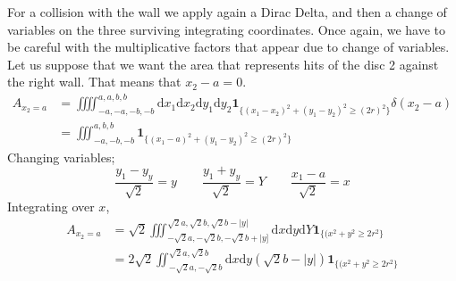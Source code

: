 \documentclass[letterpaper,10pt, jcp, aps]{revtex4-1}
\newcommand{\rd}{\!\mathrm{d}}
\newcommand{\indicator}[1]{\mathbf{1}_{ \{   #1 \} } }
\begin{document}
    For a collision with the wall we apply again a Dirac Delta, and then a change
    of variables on the three surviving integrating coordinates. Once again, we
    have to be careful with the multiplicative factors that appear due to change
    of variables. Let us suppose that we want the area that represents hits of
    the disc 2 against the right wall. That means that $x_2-a=0$. 
    \begin{align}
      A_{x_2=a} & =\iiiint_{-a,-a,-b,-b}^{a,a,b,b} \rd x_1 \rd x_2 \rd y_1 \rd y_2 
      \indicator{(x_1-x_2)^2+(y_1-y_2)^2 \geq (2 r)^2} \delta (x_2-a)\\
      &=\iiint_{-a,-b,-b}^{a,b,b} \indicator{(x_1-a)^2+(y_1-y_2)^2 \geq (2 r)^2} 
    \end{align}
    Changing variables;
    \begin{equation}
      \frac{y_1-y_y}{\sqrt{2}} =  y  \qquad \frac{y_1+y_y}{\sqrt{2}}=Y \qquad \frac{x_1-a}{\sqrt{2}}=x
    \end{equation}
    Integrating over $x$,
    \begin{align}\label{areachoquexy}
      A_{x_2=a} & =\sqrt{2}\iiint_{-\sqrt{2}a,-\sqrt{2}b,-\sqrt{2}b+|y]}^{\sqrt{2}a,\sqrt{2}b,\sqrt{2}b-|y|}
        \rd x \rd y \rd Y 
      \indicator{(x^2+y^2 \geq 2 r^2} \\
      &=2\sqrt{2}\iint_{-\sqrt{2}a,-\sqrt{2}b}^{\sqrt{2}a,\sqrt{2}b}
        \rd x \rd y (\sqrt{2} b - |y|)
      \indicator{(x^2+y^2 \geq 2 r^2}
    \end{align}
    
\end{document}
